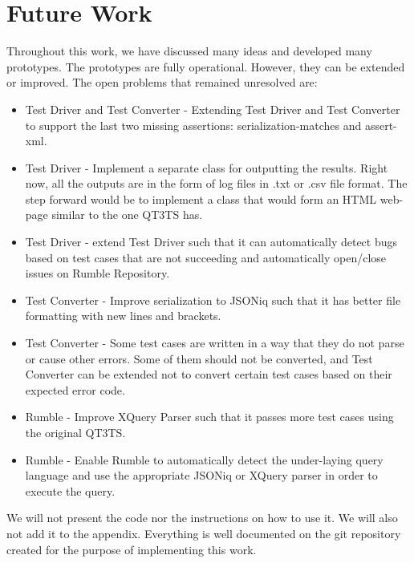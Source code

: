 \section{Future Work}
Throughout this work, we have discussed many ideas and developed many prototypes. The prototypes are fully operational. However, they can be extended or improved. The open problems that remained unresolved are:
\begin{itemize}
	\item Test Driver and Test Converter - Extending Test Driver and Test Converter to support the last two missing assertions: serialization-matches and assert-xml.
	\item Test Driver - Implement a separate class for outputting the results. Right now, all the outputs are in the form of log files in .txt or .csv file format. The step forward would be to implement a class that would form an HTML web-page similar to the one QT3TS has.
	\item Test Driver - extend Test Driver such that it can automatically detect bugs based on test cases that are not succeeding and automatically open/close issues on Rumble Repository.
	\item Test Converter - Improve serialization to JSONiq such that it has better file formatting with new lines and brackets.
	\item Test Converter - Some test cases are written in a way that they do not parse or cause other errors. Some of them should not be converted, and Test Converter can be extended not to convert certain test cases based on their expected error code.
	\item Rumble - Improve XQuery Parser such that it passes more test cases using the original QT3TS.
	\item Rumble - Enable Rumble to automatically detect the under-laying query language and use the appropriate JSONiq or XQuery parser in order to execute the query. 
\end{itemize}

We will not present the code nor the instructions on how to use it. We will also not add it to the appendix. Everything is well documented on the git repository \cite{StevanRepo} created for the purpose of implementing this work.